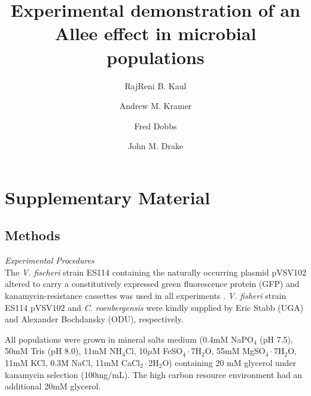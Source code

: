 \documentclass[a4paper,10pt]{article}
\begin{document}
\title{Experimental demonstration of an Allee effect in microbial populations}
\author[1*]{RajReni B. Kaul}
\author[1]{Andrew M. Kramer}
\author[2]{Fred Dobbs}
\author[1]{John M. Drake}

\date{}

\maketitle




\section{Supplementary Material}
 
 \subsection{Methods}
\textit{Experimental Procedures}\\
The \textit{V. fischeri} strain ES114 containing the naturally occurring plasmid pVSV102 altered to carry a constitutively expressed green fluorescence protein (GFP) and kanamycin-resistance cassettes was used in all experiments \cite{dunn_new_2006}.  \textit{V. fisheri} strain ES114 pVSV102 and \textit{C. roenbergensis} were kindly supplied by Eric Stabb (UGA) and Alexander Bochdansky (ODU), respectively. 
 
 All populations were grown in mineral salts medium (0.4mM NaPO$_{4}$ (pH 7.5), 50mM Tris (pH 8.0), 11mM NH$_{4}$Cl, 10$\mu$M  FeSO$_{4}\cdot$7H$_{2}$O, 55mM MgSO$_{4}\cdot$7H$_{2}$O, 11mM KCl, 0.3M NaCl, 11mM CaCl$_{2}\cdot$2H$_{2}$O) containing 20 mM glycerol under kanamycin selection (100mg/mL). The high carbon resource environment had an additional 20mM glycerol. 
\end{document}
